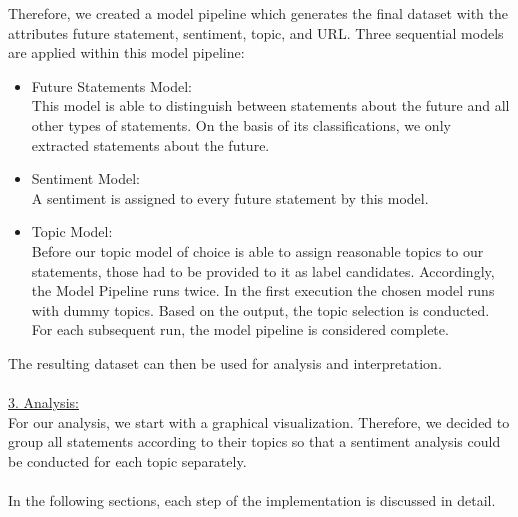 Therefore, we created a model pipeline which generates the final dataset with the attributes future statement, sentiment, topic, and URL.
Three sequential models are applied within this model pipeline:
\begin{itemize}
    \item Future Statements Model:\\
    This model is able to distinguish between statements about the future and all other types of statements.
On the basis of its classifications, we only extracted statements about the future.
    \item Sentiment Model:\\
A sentiment is assigned to every future statement by this model.
    \item Topic Model: \\
    Before our topic model of choice is able to assign  reasonable topics to our statements, those had to be provided to it as label candidates.
Accordingly, the Model Pipeline runs twice. In the first execution the chosen model runs with dummy topics. Based on the output, the topic selection is conducted.
For each subsequent run, the model pipeline is considered complete.
\end{itemize}%
%
The resulting dataset can then be used for analysis and interpretation.
\\
\\
\underline{3. Analysis:}
\\
For our analysis, we start with a graphical visualization.
Therefore, we decided to group all statements according to their topics so that a sentiment analysis could be conducted for each topic separately.
\\
\\
In the following sections, each step of the implementation is discussed in detail.


